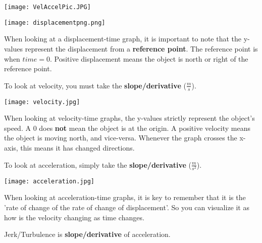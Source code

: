 \documentclass[12pt,fleqn]{book} %
\begin{document}
\vspace*{2mm}

\texttt{[image: VelAccelPic.JPG]}

\pagebreak

\begin{multicols}{2}
    \texttt{[image: displacementpng.png]}
    \columnbreak

    \indent When looking at a displacement-time
    \indent graph, it is important to note that the
    \hspace*{5.25mm} y-values represent the displacement from
    \indent a \textbf{reference point}. The reference point
    \indent is when $time=0$. Positive displacement
    \indent means the object is north or right of the
    \indent reference point.

    \vspace*{3mm}

    \indent To look at velocity, you must take the
    \indent \textbf{slope/derivative} ($\frac{m}{s}$).
\end{multicols}

\begin{multicols}{2}
    \texttt{[image: velocity.jpg]}
    \columnbreak

    \indent When looking at velocity-time graphs,
    \indent the y-values strictly represent the
    \indent object's speed. A $0$ does \textbf{not} mean the
    \indent object is at the origin. A positive velocity
    \indent means the object is moving north, and
    \indent vice-versa. Whenever the graph crosses
    \indent the x-axis, this means it has changed
    \indent directions.

    \vspace*{3mm}

    \indent To look at acceleration, simply take
    \indent the \textbf{slope/derivative} ($\frac{m}{s^2}$).
\end{multicols}

\begin{multicols}{2}
    \texttt{[image: acceleration.jpg]}
    \columnbreak

    \indent When looking at acceleration-time
    \indent graphs, it is key to remember that it is
    \hspace*{2.4mm} the 'rate of change of the rate of change
    \indent of displacement'. So you can visualize
    \indent it as how is the velocity changing as time
    \indent changes.

    \vspace*{3mm}

    \indent Jerk/Turbulence is \textbf{slope/derivative} of
    \indent acceleration.
    \indent
\end{multicols}
\end{document}
